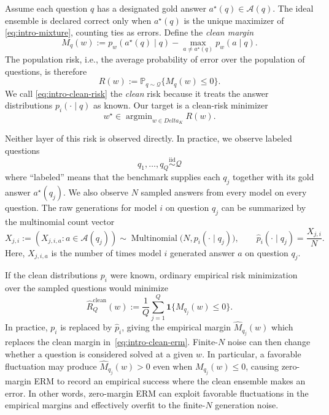 \documentclass[11pt]{article}
\def\Delta{Delta}%
\newcommand{\Pp}{\mathbb P}
\newcommand{\one}{\mathbf 1}
\newcommand{\calQ}{\mathcal Q}
\newcommand{\calA}{\mathcal A}
\DeclareMathOperator*{\argmin}{argmin}
\begin{document}
Assume each question $q$ has a designated gold answer $a^\star(q)\in\calA(q)$.  The ideal ensemble is declared correct only when $a^\star(q)$ is the unique maximizer of \eqref{eq:intro-mixture}, counting ties as errors.  Define the \emph{clean margin}
\begin{equation}
\label{eq:intro-clean-margin}
M_q(w)
:=
p_w(a^\star(q)\mid q)
-
\max_{a\ne a^\star(q)}p_w(a\mid q).
\end{equation}
The population risk, i.e., the average probability of error over the population of questions, is therefore
\begin{equation}
\label{eq:intro-clean-risk}
R(w)
:=
\Pp_{q\sim\calQ}\{M_q(w)\le0\}.
\end{equation}
We call \eqref{eq:intro-clean-risk} the \emph{clean} risk because it treats the answer distributions $p_i(\cdot\mid q)$ as known.  Our target is a clean-risk minimizer
\begin{equation}
\label{eq:intro-oracle}
w^\star\in\argmin_{w\in\Delta_K}R(w).
\end{equation}

Neither layer of this risk is observed directly.  In practice, we observe labeled questions
\[
q_1,\ldots,q_Q\overset{\mathrm{iid}}{\sim}\calQ
\]
where ``labeled'' means that the benchmark supplies each $q_j$ together with its gold answer $a^\star(q_j)$.  We also observe $N$ sampled answers from every model on every question.  The raw generations for model $i$ on question $q_j$ can be summarized by the multinomial count vector
\[
X_{j,i}
:=
(X_{j,i,a}:a\in\calA(q_j))
\sim
\operatorname{Multinomial}\bigl(N,p_i(\cdot\mid q_j)\bigr),
\qquad
\widehat p_i(\cdot\mid q_j)=\frac{X_{j,i}}{N}.
\]
Here, $X_{j,i,a}$ is the number of times model $i$ generated answer $a$ on question $q_j$.

If the clean distributions $p_i$ were known, ordinary empirical risk minimization over the sampled questions would minimize
\begin{equation}
\label{eq:intro-clean-erm}
\widehat R_Q^{\mathrm{clean}}(w)
:=
\frac1Q\sum_{j=1}^Q\one\{M_{q_j}(w)\le0\}.
\end{equation}
In practice, $p_i$ is replaced by $\widehat p_i$, giving the empirical margin $\widehat M_{q_j}(w)$ which replaces the clean margin in~\eqref{eq:intro-clean-erm}.
Finite-$N$ noise can then change whether a question is considered solved at a given $w$.  In particular, a favorable fluctuation may produce $\widehat M_{q_j}(w)>0$ even when $M_{q_j}(w)\le0$, causing zero-margin ERM to record an empirical success where the clean ensemble makes an error.  In other words, zero-margin ERM can exploit favorable fluctuations in the empirical margins and effectively overfit to the finite-$N$ generation noise.
\end{document}
